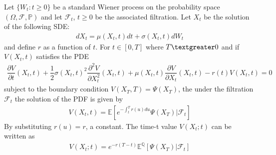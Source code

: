 Let $\{W_t: t \geq 0\}$ be a standard Wiener process on the probability space $(\Omega, \mathcal{F}, \mathbb{P})$ and let $\mathcal{F}_t$, $t \geq 0$ be the associated filtration. Let $X_t$ be the solution of the following SDE:
\begin{align*}
dX_t=\mu(X_t,t)dt+\sigma(X_t,t)dW_t
\end{align*} 
and define $r$ as a function of $t$. For $t\in [0,T]$ where $T \textgreater 0$ and if $V(X_t,t)$ satisfies the PDE
\begin{align}
\dfrac{\partial V}{\partial t}(X_t,t)+\dfrac{1}{2}\sigma(X_t,t)^2\dfrac{\partial^2V}{\partial X_t^2}(X_t,t)+\mu(X_t,t)\dfrac{\partial V}{\partial X_t}(X_t,t)-r(t)V(X_t,t)=0 \label{eq5.3.1}
\end{align} 
subject to the boundary condition $V(X_T,T)=\Psi (X_T)$, the under the filtration $\mathcal{F}_t$ the solution of the PDF is given by 
\begin{align*}
V(X_t,t)=\mathbb{E} \left[e^{-\int_{t}^{T}r(u)du}\Psi (X_T)\bigg|\mathcal{F}_t\right]
\end{align*}
By substituting $r(u)=r$, a constant. The time-t value $V(X_t; t)$ can be written as
\begin{align}
V(X_t; t)=e^{-r(T-t)}\mathbb{E}^\mathbb{Q}\left[\Psi (X_T)\bigg|\mathcal{F}_t\right]\label{eq5.3.2}
\end{align} 


